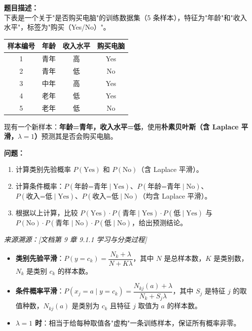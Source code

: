 \documentclass[a4paper,11pt]{ctexart}
\begin{document}
\begin{problembox}
    \textbf{题目描述：}\\
    下表是一个关于"是否购买电脑"的训练数据集（5 条样本），特征为"年龄"和"收入水平"，标签为"购买（Yes/No）"。

    \begin{center}
    \begin{tabular}{cccc}
        \toprule
        样本编号 & 年龄 & 收入水平 & 购买电脑 \\
        \midrule
        1 & 青年 & 高 & Yes \\
        2 & 青年 & 低 & No  \\
        3 & 中年 & 高 & Yes \\
        4 & 老年 & 低 & Yes \\
        5 & 老年 & 低 & No  \\
        \bottomrule
    \end{tabular}
    \end{center}

    现有一个新样本：\textbf{年龄=青年，收入水平=低}，使用\textbf{朴素贝叶斯（含 Laplace 平滑，$\lambda=1$）}预测其是否会购买电脑。

    \vspace{0.2cm}
    \textbf{问题：}
    \begin{enumerate}[(1)]
        \item 计算类别先验概率 $P(\text{Yes})$ 和 $P(\text{No})$（含 Laplace 平滑）。
        \item 计算条件概率：$P(\text{年龄=青年} \mid \text{Yes})$、$P(\text{年龄=青年} \mid \text{No})$、$P(\text{收入=低} \mid \text{Yes})$、$P(\text{收入=低} \mid \text{No})$（均含 Laplace 平滑）。
        \item 根据以上计算，比较 $P(\text{Yes}) \cdot P(\text{青年}\mid\text{Yes}) \cdot P(\text{低}\mid\text{Yes})$ 与 $P(\text{No}) \cdot P(\text{青年}\mid\text{No}) \cdot P(\text{低}\mid\text{No})$，给出预测结论。
    \end{enumerate}

    \vspace{0.2cm}
    {\color{gray}\small\textit{来源溯源：[文档第 9 章 9.1.1 学习与分类过程]}}
\end{problembox}

\begin{beginnerbox}
    \begin{itemize}
        \item \textbf{类别先验平滑}：$P(y = c_k) = \dfrac{N_k + \lambda}{N + K\lambda}$，其中 $N$ 是总样本数，$K$ 是类别数，$N_k$ 是类别 $c_k$ 的样本数。
        \item \textbf{条件概率平滑}：$P(x_j = a \mid y = c_k) = \dfrac{N_{kj}(a) + \lambda}{N_k + S_j \lambda}$，其中 $S_j$ 是特征 $j$ 的取值种数，$N_{kj}(a)$ 是类别为 $c_k$ 且特征 $j$ 取值为 $a$ 的样本数。
        \item \textbf{$\lambda=1$ 时}：相当于给每种取值各"虚构"一条训练样本，保证所有概率非零。
    \end{itemize}
\end{beginnerbox}
\end{document}
